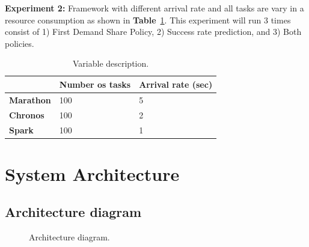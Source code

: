 \documentclass[12pt,oneside,openright,a4paper]{cpe-english-project}
\begin{document}
\textbf{Experiment 2:} Framework with different arrival rate and all tasks are vary in a resource consumption as shown in \textbf{Table}~\ref{tbl:Experiment2}. This experiment will run 3 times consist of 1) First Demand Share Policy, 2) Success rate prediction, and 3) Both policies.

\begin{table}[!h]
  \caption{Variable description.}\label{tbl:Experiment2}
  \begin{tabular}{@{}|p{}|p{}|p{}|}
    \hline
    & \textbf{Number os tasks} & \textbf{Arrival rate (sec)}\\
    \hline
    \textbf{Marathon} & 100 & 5\\
    \hline
    \textbf{Chronos} & 100 & 2 \\
    \hline
    \textbf{Spark} & 100 & 1 \\
    \hline
  \end{tabular}
\end{table}

\newpage

\section{System Architecture}

\subsection{Architecture diagram}  

\begin{figure}[!h]\centering
  \setlength{\fboxrule}{0mm} %
  \setlength{\fboxsep}{0cm}
  \caption{Architecture diagram.}\label{fig:ArchitectureDiagram}
\end{figure}
\end{document}
